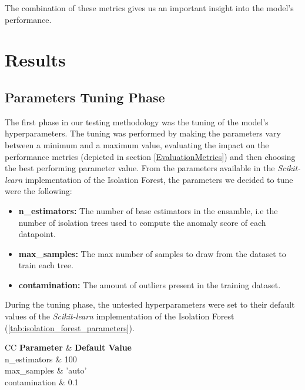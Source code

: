 \documentclass[futureinternet,article,submit,pdftex,moreauthors]{Definitions/mdpi}
\begin{document}
The combination of these metrics gives us an important insight into the model's performance. 

\section{Results}

\subsection{Parameters Tuning Phase}

The first phase in our testing methodology was the tuning of the model's hyperparameters. The tuning was performed by making the parameters vary between a minimum and a maximum value, evaluating the impact on the performance metrics (depicted in section \ref{EvaluationMetrics}) and then choosing the best performing parameter value.
From the parameters available in the \textit{Scikit-learn} implementation of the Isolation Forest, the parameters we decided to tune were the following: 

\begin{itemize}
	\item \textbf{n\_estimators:} The number of base estimators in the ensamble, i.e the number of isolation trees used to compute the anomaly score of each datapoint. 
	\item \textbf{max\_samples:} The max number of samples to draw from the dataset to train each tree.
	\item \textbf{contamination:} The amount of outliers present in the training dataset.  
\end{itemize}

During the tuning phase, the untested hyperparameters were set to their default values of the \textit{Scikit-learn} implementation of the Isolation Forest (\ref{tab:isolation_forest_parameters}).

\begin{table}[H]
	\caption{Scikit-Learn Isolation Forest hyperparameters default values.\label{tab:isolation_forest_parameters}}
	\begin{tabularx}{\textwidth}{CC}
	\toprule
	\textbf{Parameter} & \textbf{Default Value} \\
	\midrule
	n\_estimators & 100 \\
	max\_samples & 'auto' \\
	contamination & 0.1 \\
	\bottomrule
	\end{tabularx}
\end{table}
\end{document}
